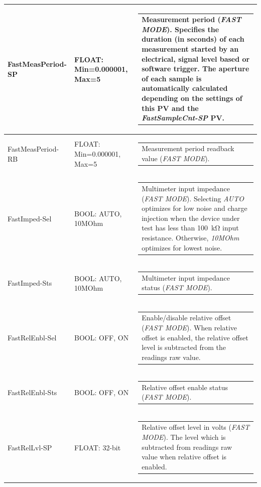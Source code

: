 \documentclass[openany]{article}
\begin{document}
\begin{longtable}{| m{3.0cm} m{4.5cm} m{7.0cm} |}
		FastMeasPeriod-SP & FLOAT: Min=0.000001, Max=5 & \begin{tabular}{@{}m{6cm}@{}}
	    					Measurement period (\emph{FAST MODE}). Specifies the duration (in seconds) of each measurement started by an electrical, signal level based or software trigger. The aperture of each sample is automatically calculated depending on the settings of this PV and the \emph{FastSampleCnt-SP} PV.
						\end{tabular} \\ \hline
		FastMeasPeriod-RB & FLOAT: Min=0.000001, Max=5 & \begin{tabular}{@{}m{6cm}@{}}
	    					Measurement period readback value (\emph{FAST MODE}).
						\end{tabular} \\ \hline
		FastImped-Sel & BOOL: AUTO, 10MOhm & \begin{tabular}{@{}m{6cm}@{}}
	    					Multimeter input impedance (\emph{FAST MODE}). Selecting \emph{AUTO} optimizes for low noise and charge injection when the device under test has less than \SI{100}{\kohm} input resistance. Otherwise, \emph{10MOhm} optimizes for lowest noise.
						\end{tabular} \\ \hline
		FastImped-Sts & BOOL: AUTO, 10MOhm & \begin{tabular}{@{}m{6cm}@{}}
	    					Multimeter input impedance status (\emph{FAST MODE}).
						\end{tabular} \\ \hline
		FastRelEnbl-Sel & BOOL: OFF, ON & \begin{tabular}{@{}m{6cm}@{}}
	    					Enable/disable relative offset (\emph{FAST MODE}). When relative offset is enabled, the relative offset level is subtracted from the readings raw value.
						\end{tabular} \\ \hline
		FastRelEnbl-Sts & BOOL: OFF, ON & \begin{tabular}{@{}m{6cm}@{}}
	    					Relative offset enable status (\emph{FAST MODE}).
						\end{tabular} \\ \hline
		FastRelLvl-SP & FLOAT: 32-bit & \begin{tabular}{@{}m{6cm}@{}}
	    					Relative offset level in volts (\emph{FAST MODE}). The level which is subtracted from readings raw value when relative offset is enabled.
						\end{tabular} \\ \hline

\end{longtable}
\end{document}
